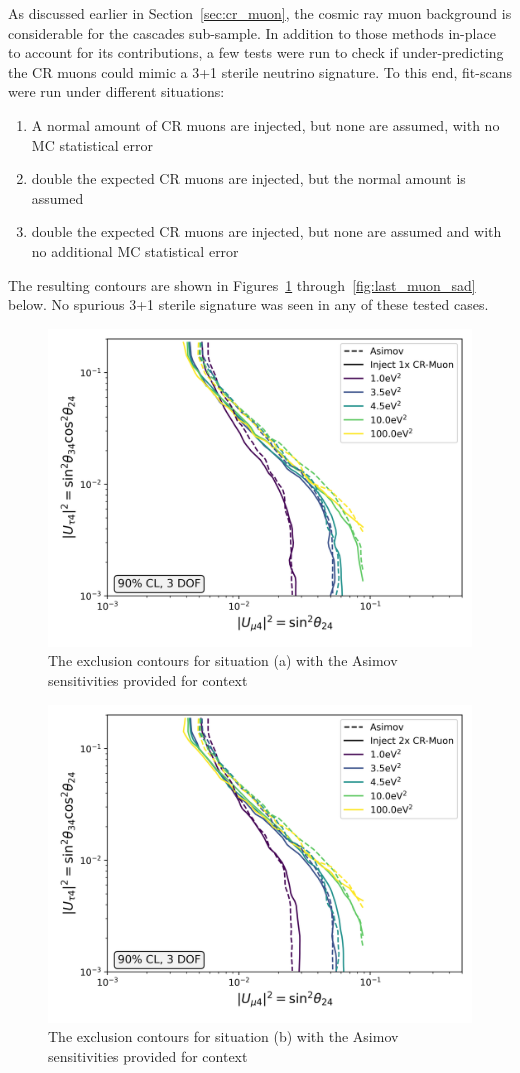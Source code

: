 \documentclass[main.tex]{subfiles}
\begin{document}
As discussed earlier in Section~\ref{sec:cr_muon}, the cosmic ray muon background is considerable for the cascades sub-sample. 
In addition to those methods in-place to account for its contributions, a few tests were run to check if under-predicting the CR muons could mimic a 3+1 sterile neutrino signature. 
To this end, fit-scans were run under different situations:
\begin{enumerate}[label=(\alph*)]
    \item A normal amount of CR muons are injected, but none are assumed, with no MC statistical error 
    \item double the expected CR muons are injected, but the normal amount is assumed 
    \item double the expected CR muons are injected, but none are assumed and with no additional MC statistical error 
\end{enumerate}
The resulting contours are shown in Figures~\ref{fig:first_muon_sad} through~\ref{fig:last_muon_sad} below. 
No spurious 3+1 sterile signature was seen in any of these tested cases.

\begin{figure}
    \centering
    \includegraphics[width=0.7\linewidth]{figures/double_muon_mismodel_worse_Realization_Asimov_sterile_0_cl0.9_dof3.png}
    \caption{The exclusion contours for situation (a) with the Asimov sensitivities provided for context}\label{fig:first_muon_sad}
\end{figure}  


\begin{figure}
    \centering
    \includegraphics[width=0.7\linewidth]{figures/double_muon_mismodel_Realization_doublcr_sterile_0_cl0.9_dof3.png}
    \caption{The exclusion contours for situation (b) with the Asimov sensitivities provided for context}
\end{figure}   
\end{document}
